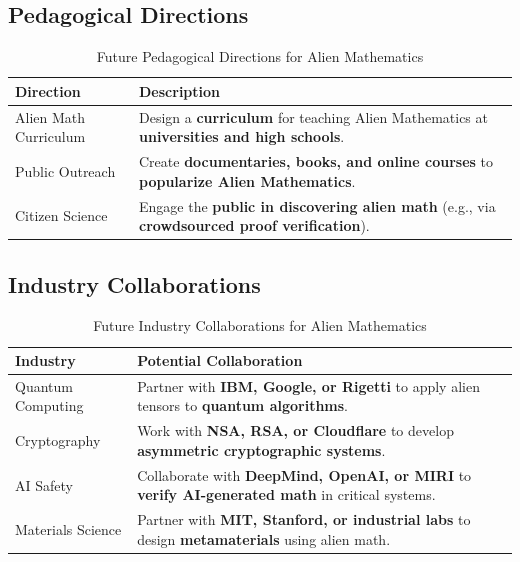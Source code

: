 \documentclass[11pt, a4paper]{article}
\begin{document}
\subsection{Pedagogical Directions}
\begin{table}[h]
\centering
\caption{Future Pedagogical Directions for Alien Mathematics}
\label{tab:future_pedagogy}
\begin{tabular}{|>{\raggedright\arraybackslash}p{4cm}|>{\raggedright\arraybackslash}p{6cm}|}
\hline
\textbf{Direction} & \textbf{Description} \\
\hline
Alien Math Curriculum & Design a \textbf{curriculum} for teaching Alien Mathematics at \textbf{universities and high schools}. \\
\hline
Public Outreach & Create \textbf{documentaries, books, and online courses} to \textbf{popularize Alien Mathematics}. \\
\hline
Citizen Science & Engage the \textbf{public in discovering alien math} (e.g., via \textbf{crowdsourced proof verification}). \\
\hline
\end{tabular}
\end{table}

\subsection{Industry Collaborations}
\begin{table}[h]
\centering
\caption{Future Industry Collaborations for Alien Mathematics}
\label{tab:future_industry}
\begin{tabular}{|>{\raggedright\arraybackslash}p{4cm}|>{\raggedright\arraybackslash}p{6cm}|}
\hline
\textbf{Industry} & \textbf{Potential Collaboration} \\
\hline
Quantum Computing & Partner with \textbf{IBM, Google, or Rigetti} to apply alien tensors to \textbf{quantum algorithms}. \\
\hline
Cryptography & Work with \textbf{NSA, RSA, or Cloudflare} to develop \textbf{asymmetric cryptographic systems}. \\
\hline
AI Safety & Collaborate with \textbf{DeepMind, OpenAI, or MIRI} to \textbf{verify AI-generated math} in critical systems. \\
\hline
Materials Science & Partner with \textbf{MIT, Stanford, or industrial labs} to design \textbf{metamaterials} using alien math. \\
\hline
\end{tabular}
\end{table}
\end{document}
